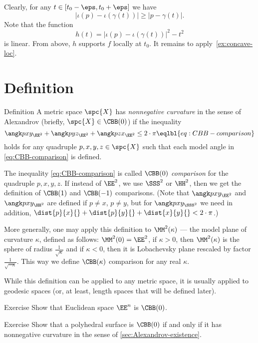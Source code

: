 Clearly, for any $t\in[t_0-\eps,t_0+\eps]$ 
we have 
$$|\iota(p)-\iota(\gamma(t))|\ge|p-\gamma(t)|.$$
Note that
the function
$$h(t)= |\iota(p)-\iota(\gamma(t))|^2-t^2$$
is linear.
From above, $h$ supports $f$ locally  at $t_0$.
It remains to apply~\ref{ex:concave-loc}.
\qeds

\section{Definition}

\begin{thm}{Definition}\label{def:CBB}
A metric space $\spc{X}$ has {}\emph{nonnegative curvature} in the sense of Alexandrov (briefly, $\spc{X}\in\CBB(0)$) if the inequality 
\[\angk  pxy_{\EE^2}+\angk pyz_{\EE^2}+\angk pzx_{\EE^2}
\le 
2\cdot\pi
\eqlbl{eq:CBB-comparison}\]
holds for any quadruple $p,x,y,z\in\spc{X}$ such that each model angle in \ref{eq:CBB-comparison} is defined. 

The inequality \ref{eq:CBB-comparison} is called \emph{$\CBB(0)$ comparison} for the quadruple $p,x,y,z$.
If instead of $\EE^2$, we use $\SSS^2$ or $\HH^2$, then we get the definition of
$\CBB(1)$ and $\CBB(-1)$ comparisons.
(Note that $\angk  pxy_{\EE^2}$ and $\angk  pxy_{\HH^2}$ are defined if $p\ne x$, $p\ne y$,
but for $\angk  pxy_{\SSS^2}$ we need in addition, $\dist{p}{x}{}+\dist{p}{y}{}+\dist{x}{y}{}<2\cdot\pi$.)

More generally, one may apply this definition to $\MM^2(\kappa)$ --- the model plane of curvature $\kappa$, defined as follows:
$\MM^2(0)=\EE^2$,
if $\kappa>0$, then $\MM^2(\kappa)$ is the sphere of radius $\tfrac{1}{\sqrt{\kappa}}$ and if $\kappa<0$, then it is Lobachevsky plane rescaled by factor $\tfrac{1}{\sqrt{-\kappa}}$.
This way we define $\CBB(\kappa)$ comparison for any real $\kappa$.
\end{thm}

While this definition can be applied to any metric space,
it is usually applied to geodesic spaces (or, at least, length spaces that will be defined later).

\begin{thm}{Exercise}
Show that Euclidean space $\EE^n$ is $\CBB(0)$.
\end{thm}


\begin{thm}{Exercise}\label{ex:polyCBB}
Show that a polyhedral surface is $\CBB(0)$ if and only if it has nonnegative curvature in the sense of \ref{sec:Alexandrov-existence}. 
\end{thm}





